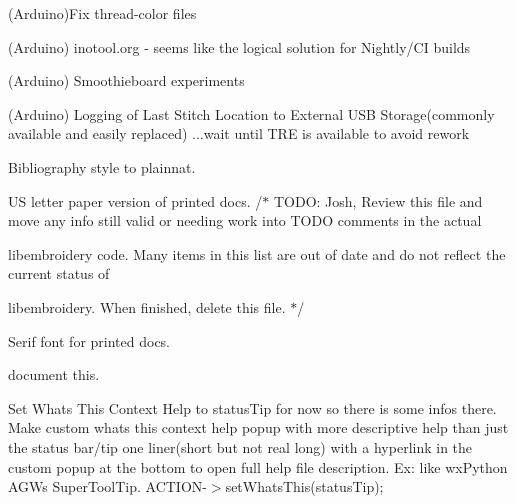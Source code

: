 \begin{DoxyRefList}
\label{todo__todo000194}%
%
(Arduino)Fix thread-\/color files

\label{todo__todo000196}%
%
(Arduino) inotool.\+org -\/ seems like the logical solution for Nightly/\+CI builds

\label{todo__todo000197}%
%
(Arduino) Smoothieboard experiments

\label{todo__todo000195}%
%
(Arduino) Logging of Last Stitch Location to External USB Storage(commonly available and easily replaced) ...wait until TRE is available to avoid rework 
\item[Page \mbox{\hyperlink{_ideas}{Ideas}} ]\label{todo__todo000189}%
%
Bibliography style to plainnat.

\label{todo__todo000191}%
%
US letter paper version of printed docs. /$\ast$ TODO\+: Josh, Review this file and move any info still valid or needing work into TODO comments in the actual
\begin{DoxyItemize}
\item libembroidery code. Many items in this list are out of date and do not reflect the current status of
\item libembroidery. When finished, delete this file. $\ast$/
\end{DoxyItemize}

\label{todo__todo000190}%
%
Serif font for printed docs. 
\item[Member \mbox{\hyperlink{embroidermodder_8h_a59b98c3061d780d55cc048bcce8b47d0}{Index}} ]\label{todo__todo000002}%
%
document this.  
\item[Member \mbox{\hyperlink{class_main_window_a5de9bc12f363ba45fb8082f262d24deb}{Main\+Window\+::create\+All\+Actions}} ()]\label{todo__todo000003}%
%
Set What\textquotesingle{}s This Context Help to status\+Tip for now so there is some infos there. Make custom whats this context help popup with more descriptive help than just the status bar/tip one liner(short but not real long) with a hyperlink in the custom popup at the bottom to open full help file description. Ex\+: like wx\+Python AGW\textquotesingle{}s Super\+Tool\+Tip. ACTION-\/\texorpdfstring{$>$}{>}set\+Whats\+This(status\+Tip); 




\end{DoxyRefList}
